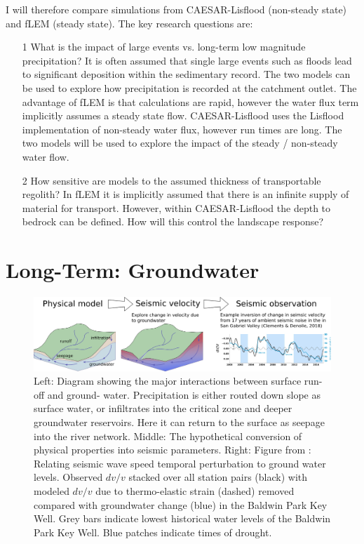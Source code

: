 I will therefore compare simulations from CAESAR-Lisflood (non-steady state) and fLEM (steady state). The key research questions are:
\begin{itemize}
    \item[1] What is the impact of large events vs. long-term low magnitude precipitation? It is often assumed that single large events such as floods lead to significant deposition within the sedimentary record. The two models can be used to explore how precipitation is recorded at the catchment outlet. The advantage of fLEM is that calculations are rapid, however the water flux term implicitly assumes a steady state flow. CAESAR-Lisflood uses the Lisflood implementation of non-steady water flux, however run times are long. The two models will be used to explore the impact of the steady / non-steady water flow.
    \item[2] How sensitive are models to the assumed thickness of transportable regolith? In fLEM it is implicitly assumed that there is an infinite supply of material for transport. However, within CAESAR-Lisflood the depth to bedrock can be defined. How will this control the landscape response?
\end{itemize}

\section{Long-Term: Groundwater}

\begin{figure}
    \centering
    \includegraphics[width=\textwidth]{./figures/groundwater.png}
    \caption{Left: Diagram showing the major interactions between surface run-off and ground-
water. Precipitation is either routed down slope as surface water, or infiltrates into the
critical zone and deeper groundwater reservoirs. Here it can return to the surface as seepage
into the river network. Middle: The hypothetical conversion of physical properties into seismic parameters. Right: Figure from \cite{clements-2018}: Relating seismic wave speed temporal perturbation to ground water levels. Observed $dv/v$ stacked over all station pairs (black) with modeled $dv/v$ due to thermo-elastic strain (dashed) removed compared with groundwater change (blue) in the Baldwin Park Key Well. Grey bars indicate lowest historical water levels of the Baldwin Park Key Well. Blue patches indicate times of drought.}
    \label{fg:groundwater}
\end{figure}

